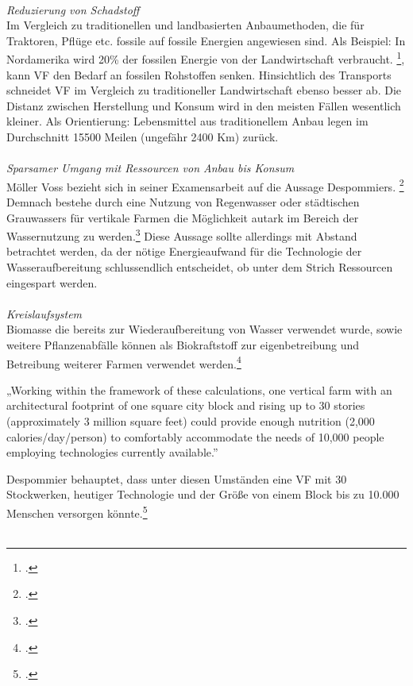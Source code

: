 \documentclass{scrartcl}
\begin{document}
\\
\textit{Reduzierung von Schadstoff}\\
Im Vergleich zu traditionellen und landbasierten Anbaumethoden, die für Traktoren, Pflüge etc. fossile auf fossile Energien angewiesen sind. Als Beispiel: In Nordamerika wird 20\% der fossilen Energie von der Landwirtschaft verbraucht. \footcite[Vgl.][S.27]{Al-Kodmany2018TheCity[82,83}, kann VF den Bedarf an fossilen Rohstoffen senken. Hinsichtlich des Transports schneidet VF im Vergleich zu traditioneller Landwirtschaft ebenso besser ab. Die Distanz zwischen Herstellung und Konsum wird in den meisten Fällen wesentlich kleiner. Als Orientierung: Lebensmittel aus traditionellem Anbau legen im Durchschnitt 15500 Meilen (ungefähr 2400 Km) zurück.\\
\\
\textit{Sparsamer Umgang mit Ressourcen von Anbau bis Konsum}\\
Möller Voss bezieht sich in seiner Examensarbeit auf die Aussage Despommiers. \footcite[S.9]{PeterMollerVoss2013VerticalRise} Demnach bestehe durch eine Nutzung von Regenwasser oder städtischen Grauwassers für vertikale Farmen die Möglichkeit autark im Bereich der Wassernutzung zu werden.\footcites[Vgl.]{Despommier2010TheCentury.} Diese Aussage sollte allerdings mit Abstand betrachtet werden, da der nötige Energieaufwand für die Technologie der Wasseraufbereitung schlussendlich entscheidet, ob unter dem Strich Ressourcen eingespart werden.\\
\\
\textit{Kreislaufsystem}\\
Biomasse die bereits zur Wiederaufbereitung von Wasser verwendet wurde, sowie weitere Pflanzenabfälle können als Biokraftstoff zur eigenbetreibung und Betreibung weiterer Farmen verwendet werden.\footcites[Vgl.][S.80ff]{Despommier2009TheFarms}\\

\begin{displayquote}
„Working within the framework of these calculations, one vertical farm with an architectural footprint of one square city block and rising up to 30 stories (approximately 3 million square feet) could provide enough nutrition (2,000 calories/day/person) to comfortably accommodate the needs of 10,000 people employing technologies currently available.” 
\end{displayquote}

Despommier behauptet, dass unter diesen Umständen eine VF mit 30 Stockwerken, heutiger Technologie und der Größe von einem Block bis zu 10.000 Menschen versorgen könnte.\footcite{Despommier2010TheCentury.}\\
\\
\end{document}
